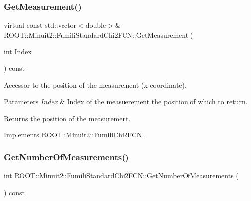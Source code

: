 \mbox{\label{classROOT_1_1Minuit2_1_1FumiliStandardChi2FCN_a3bbc9a9cb77ce45aa764aa1f6e74349c}} 
\subsubsection{\texorpdfstring{GetMeasurement()}{GetMeasurement()}\hspace{0.1cm}{\footnotesize\ttfamily [3/3]}}
{\footnotesize\ttfamily virtual const std\+::vector$<$double$>$\& R\+O\+O\+T\+::\+Minuit2\+::\+Fumili\+Standard\+Chi2\+F\+C\+N\+::\+Get\+Measurement (\begin{DoxyParamCaption}\item[{int}]{Index }\end{DoxyParamCaption}) const\hspace{0.3cm}{\ttfamily [virtual]}}

Accessor to the position of the measurement (x coordinate).


\begin{DoxyParams}{Parameters}
{\em Index} & Index of the measuerement the position of which to return.\\
\hline
\end{DoxyParams}
\begin{DoxyReturn}{Returns}
the position of the measurement. 
\end{DoxyReturn}


Implements \mbox{\hyperlink{classROOT_1_1Minuit2_1_1FumiliChi2FCN_a1831875c53596cd4aa52ea536de53b60}{R\+O\+O\+T\+::\+Minuit2\+::\+Fumili\+Chi2\+F\+CN}}.

\mbox{\label{classROOT_1_1Minuit2_1_1FumiliStandardChi2FCN_a27414beb35c9c18156e6b3781aaf587f}} 
\subsubsection{\texorpdfstring{GetNumberOfMeasurements()}{GetNumberOfMeasurements()}\hspace{0.1cm}{\footnotesize\ttfamily [1/3]}}
{\footnotesize\ttfamily int R\+O\+O\+T\+::\+Minuit2\+::\+Fumili\+Standard\+Chi2\+F\+C\+N\+::\+Get\+Number\+Of\+Measurements (\begin{DoxyParamCaption}{ }\end{DoxyParamCaption}) const\hspace{0.3cm}{\ttfamily [virtual]}}

